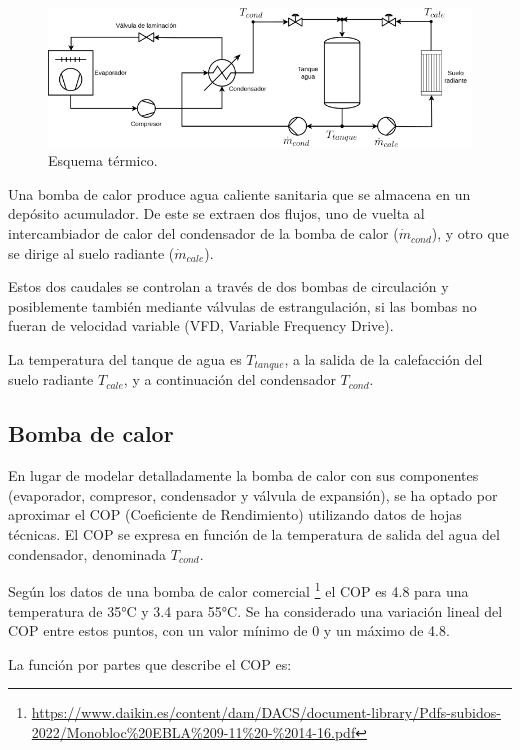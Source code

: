 \begin{figure}[h] \centering
	\centering
	\includegraphics[width=1\textwidth]{./capitulos/resultados_discusion/images/sistema_termico.png}
	\caption{Esquema térmico.}
	\label{fig:thermal_diagram}
\end{figure}

Una bomba de calor produce agua caliente sanitaria que se almacena en un
depósito acumulador. De este se extraen dos flujos, uno de vuelta al
intercambiador de calor del condensador de la bomba de calor
($\dot{m}_{cond}$), y otro que se dirige al suelo radiante ($\dot{m}_{cale}$).

Estos dos caudales se controlan a través de dos bombas de circulación y
posiblemente también mediante válvulas de estrangulación, si las bombas no
fueran de velocidad variable (VFD, Variable Frequency Drive).

La temperatura del tanque de agua es $T_{tanque}$, a la salida de la calefacción
del suelo radiante $T_{cale}$, y a continuación del condensador $T_{cond}$.

\subsection{Bomba de calor}

En lugar de modelar detalladamente la bomba de calor con sus componentes
(evaporador, compresor, condensador y válvula de expansión), se ha optado por
aproximar el COP (Coeficiente de Rendimiento) utilizando datos de hojas
técnicas. El COP se expresa en función de la temperatura de salida del agua del
condensador, denominada $T_{cond}$.

Según los datos de una bomba de calor comercial
\footnote{\url{https://www.daikin.es/content/dam/DACS/document-library/Pdfs-subidos-2022/Monobloc\%20EBLA\%209-11\%20-\%2014-16.pdf}}
el COP es 4.8 para una temperatura de 35°C y 3.4 para 55°C. Se ha considerado
una variación lineal del COP entre estos puntos, con un valor mínimo de 0 y un
máximo de 4.8.

La función por partes que describe el COP es:

